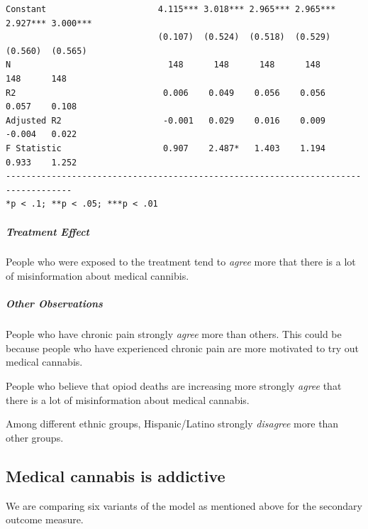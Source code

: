 \documentclass[
]{article}
\begin{document}
\begin{verbatim}
Constant                      4.115*** 3.018*** 2.965*** 2.965*** 2.927*** 3.000***
                              (0.107)  (0.524)  (0.518)  (0.529)  (0.560)  (0.565) 
N                               148      148      148      148      148      148   
R2                             0.006    0.049    0.056    0.056    0.057    0.108  
Adjusted R2                    -0.001   0.029    0.016    0.009    -0.004   0.022  
F Statistic                    0.907    2.487*   1.403    1.194    0.933    1.252  
-----------------------------------------------------------------------------------
*p < .1; **p < .05; ***p < .01                                                     
\end{verbatim}

\hypertarget{treatment-effect-2}{%
\subparagraph{Treatment Effect}\label{treatment-effect-2}}

People who were exposed to the treatment tend to \emph{agree} more that
there is a lot of misinformation about medical cannibis.

\hypertarget{other-observations-2}{%
\subparagraph{Other Observations}\label{other-observations-2}}

People who have chronic pain strongly \emph{agree} more than others.
This could be because people who have experienced chronic pain are more
motivated to try out medical cannabis.

People who believe that opiod deaths are increasing more strongly
\emph{agree} that there is a lot of misinformation about medical
cannabis.

Among different ethnic groups, Hispanic/Latino strongly \emph{disagree}
more than other groups.

\pagebreak

\hypertarget{medical-cannabis-is-addictive}{%
\subsection{Medical cannabis is
addictive}\label{medical-cannabis-is-addictive}}

We are comparing six variants of the model as mentioned above for the
secondary outcome measure.
\end{document}
